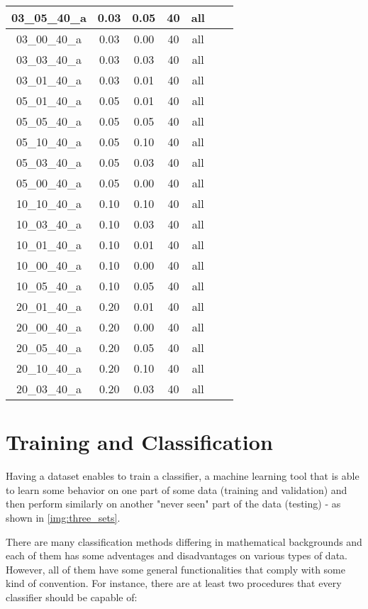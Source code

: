 \begin{table}[H]
\begin{tabular}{|c|c|c|c|c|c|c|}
03\_05\_40\_a	& 0.03	& 0.05	& 40	& all	 \\ \hline
03\_00\_40\_a	& 0.03	& 0.00	& 40	& all	 \\ \hline
03\_03\_40\_a	& 0.03	& 0.03	& 40	& all	 \\ \hline
03\_01\_40\_a	& 0.03	& 0.01	& 40	& all	 \\ \hline
05\_01\_40\_a	& 0.05	& 0.01	& 40	& all	 \\ \hline
05\_05\_40\_a	& 0.05	& 0.05	& 40	& all	 \\ \hline
05\_10\_40\_a	& 0.05	& 0.10	& 40	& all	 \\ \hline
05\_03\_40\_a	& 0.05	& 0.03	& 40	& all	 \\ \hline
05\_00\_40\_a	& 0.05	& 0.00	& 40	& all	 \\ \hline
10\_10\_40\_a	& 0.10	& 0.10	& 40	& all	 \\ \hline
10\_03\_40\_a	& 0.10	& 0.03	& 40	& all	 \\ \hline
10\_01\_40\_a	& 0.10	& 0.01	& 40	& all	 \\ \hline
10\_00\_40\_a	& 0.10	& 0.00	& 40	& all	 \\ \hline
10\_05\_40\_a	& 0.10	& 0.05	& 40	& all	 \\ \hline
20\_01\_40\_a	& 0.20	& 0.01	& 40	& all	 \\ \hline
20\_00\_40\_a	& 0.20	& 0.00	& 40	& all	 \\ \hline
20\_05\_40\_a	& 0.20	& 0.05	& 40	& all	 \\ \hline
20\_10\_40\_a	& 0.20	& 0.10	& 40	& all	 \\ \hline
20\_03\_40\_a	& 0.20	& 0.03	& 40	& all	 \\ \hline

\end{tabular}
\end{table}

\section{Training and Classification}
Having a dataset enables to train a classifier, a machine learning tool that is able to learn some behavior on one part of some data (training and validation) and then perform similarly on another "never seen" part of the data (testing) - as shown in \cref{img:three_sets}.

There are many classification methods differing in mathematical backgrounds and each of them has some adventages and disadvantages on various types of data. However, all of them have some general functionalities that comply with some kind of convention. For instance, there are at least two procedures that every classifier should be capable of:

